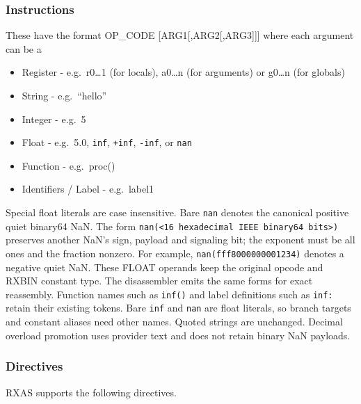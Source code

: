 \hypertarget{instructions}{%
\subsubsection{Instructions}\label{instructions}}

These have the format OP\_CODE {[}ARG1{[},ARG2{[},ARG3{]}{]}{]} where
each argument can be a

\begin{itemize}
\tightlist
\item
  Register - e.g.~r0\ldots1 (for locals), a0\ldots n (for arguments) or
  g0\ldots n (for globals)
\item
  String - e.g.~``hello''
\item
  Integer - e.g.~5
\item
  Float - e.g.~5.0, \texttt{inf}, \texttt{+inf}, \texttt{-inf}, or \texttt{nan}
\item
  Function - e.g.~proc()
\item
  Identifiers / Label - e.g.~label1
\end{itemize}

Special float literals are case insensitive. Bare \texttt{nan} denotes the
canonical positive quiet binary64 NaN. The form
\texttt{nan(<16 hexadecimal IEEE binary64 bits>)} preserves another NaN's
sign, payload and signaling bit; the exponent must be all ones and the
fraction nonzero. For example, \texttt{nan(fff8000000001234)} denotes a
negative quiet NaN. These FLOAT operands keep the original opcode and RXBIN
constant type. The disassembler emits the same forms for exact reassembly.
Function names such as \texttt{inf()} and label definitions such as
\texttt{inf:} retain their existing tokens. Bare \texttt{inf} and \texttt{nan}
are float literals, so branch targets and constant aliases need other names.
Quoted strings are unchanged. Decimal overload promotion
uses provider text and does not retain binary NaN payloads.

\hypertarget{directives}{%
\subsubsection{Directives}\label{directives}}

RXAS supports the following directives.

